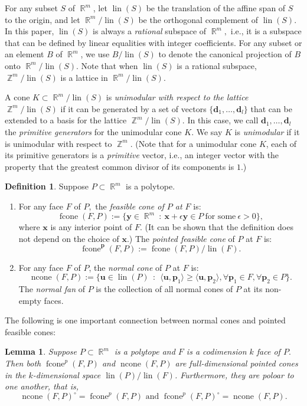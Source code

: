 \documentclass[12pt]{amsart}
\numberwithin{equation}{section}
\newtheorem{lem}[thm]{Lemma}
\theoremstyle{definition}
\newtheorem{defn}[thm]{Definition}
\def\fcone{\operatorname{fcone}}
\def\ncone{\operatorname{ncone}}
\def\lin{\operatorname{lin}}
\def\bp{\boldsymbol{p}}
\def\bd{\boldsymbol{d}}
\def\bx{\boldsymbol{x}}
\def\bp{\boldsymbol{p}}
\def\by{\boldsymbol{y}}
\def\bu{\boldsymbol{u}}
\def\bp{\boldsymbol{p}}
\def\Z{\operatorname{\mathbb{Z}}}
\def\R{\operatorname{\mathbb{R}}}
\begin{document}
For any subset $S$ of $\R^m$, let $\lin(S)$ be the translation of the affine span of $S$ to the origin, and let $\R^m/\lin(S)$ be the orthogonal complement of $\lin(S)$. In this paper, $\lin(S)$ is always a \emph{rational} subspace of $\R^m,$ i.e., it is a subspace that can be defined by linear equalities with integer coefficients. 
For any subset or an element $B$ of $\R^m$, we use $B/\lin(S)$ to denote the canonical projection of $B$ onto $\R^m/\lin(S)$. Note that when $\lin(S)$ is a rational subspace, $\Z^m/\lin(S)$ is a lattice in $\R^m/\lin(S).$

A cone $K \subset \R^m/\lin(S)$ is \emph{unimodular with respect to the lattice  $\Z^m/\lin(S)$} if it can be generated by a set of vectors $\{\bd_{1},\dots,\bd_{l}\}$ that can be extended to a basis for the lattice $\Z^m/\lin(S).$ In this case, we call $\bd_{1},\dots,\bd_{l}$ the \emph{primitive generators} for the unimodular cone $K.$ We say $K$ is \emph{unimodular} if it is unimodular with respect to $\Z^m.$ (Note that for a unimodular cone $K$, each of its primitive generators is a \emph{primitive} vector, i.e., an integer vector with the property that the greatest common divisor of its components is $1$.)
\begin{defn}\label{cones}
  Suppose $P \subset \R^m$ is a polytope.
\begin{enumerate}
  \item For any face $F$ of $P,$ the \emph{feasible cone of $P$ at $F$} is:
    \[\fcone(F,P):=\{\by \in \R^m~:~\bx+\epsilon \by \in P~\text{for some}~\epsilon>0\},\]
    where $\bx$ is any interior point of $F$. (It can be shown that the definition does not depend on the choice of $\bx$.)
    The \emph{pointed feasible cone} of $P$ at $F$ is:
    \[\fcone^{\bp}(F,P):=\fcone(F,P)/\lin(F).\]
    \item For any face $F$ of $P$, the \emph{normal cone} of $P$ at $F$ is:
\[\ncone(F, P) := \{\bu \in \lin(P) ~~:~~\langle \bu,\bp_{1} \rangle \geq \langle \bu,\bp_{2} \rangle, \forall \bp_{1} \in F, \forall \bp_{2} \in P \}.\]
The \emph{normal fan} of $P$ is the collection of all normal cones of $P$ at its non-empty faces.
   
\end{enumerate}
\end{defn}

The following is one important connection between normal cones and pointed feasible cones: 
\begin{lem}\cite[Lemma 2.4]{Castillo2015v1} \label{lem:nfcone}
  Suppose $P \subset \R^m$ is a polytope and $F$ is a codimension $k$ face of $P.$ Then both $\fcone^p(F,P)$ and $\ncone(F,P)$ are full-dimensional pointed cones in the $k$-dimensional space $\lin(P)/\lin(F)$. Furthermore, they are poloar to one another, that is,
\begin{equation}\label{eq:nfcone}
	\ncone(F,P)^{\circ}=\fcone^{p}(F,P) \text{ and } \fcone^{p}(F,P)^\circ = \ncone(F,P).
\end{equation}
\end{lem}
\end{document}
